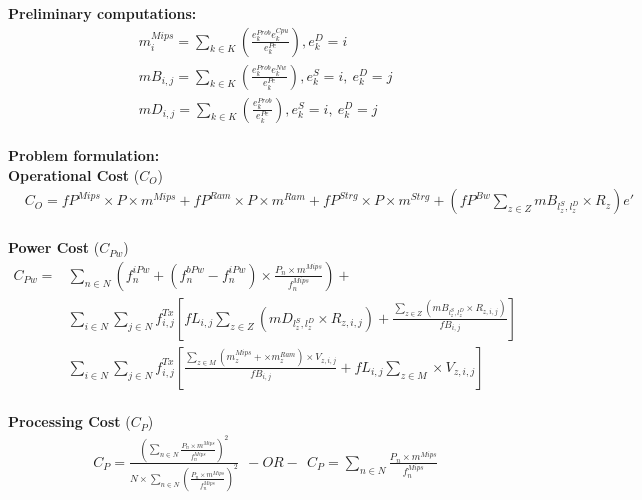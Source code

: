 \documentclass{article}
\begin{document}
\noindent\textbf{Preliminary computations:}\\[6pt]
\begin{equation*}
\begin{split}
& m^{Mips}_{i} = \sum_{k\in K} \left(\frac{e^{Prob}_k e^{Cpu}_k}{e^{Pe}_k}\right), e_k^{D} = i\\[6pt]
& mB_{i,j}= \sum_{k\in K} \left(\frac{e^{Prob}_k e^{Nw}_k}{e^{Pe}_k}\right), e^{S}_k = i,~e^{D}_k = j\\[6pt]
& mD_{i,j}= \sum_{k\in K} \left(\frac{e^{Prob}_k}{e^{Pe}_k}\right), e^{S}_k = i,~e^{D}_k = j
\end{split}
\end{equation*}\\[6pt]

\noindent\textbf{Problem formulation:}\\[12pt]
\noindent\textbf{Operational Cost} ($C_O$)\\[6pt]
\begin{equation*}
\begin{split}
	& C_O = fP^{Mips} \times P \times m^{Mips} + fP^{Ram} \times P \times m^{Ram} + fP^{Strg}\times P\times m^{Strg} + \left(fP^{Bw} \sum_{z\in Z} mB_{l^S_z,l^D_z} \times R_z\right)e'
\end{split}
\end{equation*}\\[6pt]

\noindent\textbf{Power Cost} ($C_{Pw}$)\\[6pt]
\begin{equation*}
\begin{aligned}
C_{Pw} = & \sum_{n\in N}\left(f_n^{iPw} + (f_n^{bPw} - f_n^{iPw}) \times\frac{P_n \times m^{Mips}}{f_n^{Mips}}\right) +\\
& \sum_{i\in N}\sum_{j\in N} f^{Tx}_{i, j}\left[ fL_{i,j}\sum_{z\in Z}\left( mD_{l^S_z,l^D_z} \times R_{z, i,j} \right) + \frac{\sum_{z\in Z}\left( mB_{l^S_z,l^D_z} \times R_{z, i,j} \right)}{fB_{i,j}}  \right]\\
& \sum_{i\in N}\sum_{j\in N} f^{Tx}_{i, j}\left[ \frac{\sum_{z\in M}\left(m^{Mips}_{z} + \times m^{Ram}_{z}\right) \times V_{z, i,j}}{fB_{i,j}} + fL_{i,j} \sum_{z\in M} \times V_{z, i,j} \right]
\end{aligned}
\end{equation*}\\[6pt]

\noindent\textbf{Processing Cost} ($C_P$)\\[6pt]
\begin{equation*}
\begin{aligned}
& C_P = \frac{\left(\sum_{n\in N} \frac{P_n \times m^{Mips}}{f_n^{Mips}}\right)^2}{N\times \sum_{n\in N} \left(\frac{P_n \times m^{Mips}}{f_n^{Mips}}\right)^2}~~ -OR- ~~ C_P = \sum_{n\in N} \frac{P_n \times m^{Mips}}{f_n^{Mips}}
\end{aligned}
\end{equation*}\\[6pt]
\end{document}
